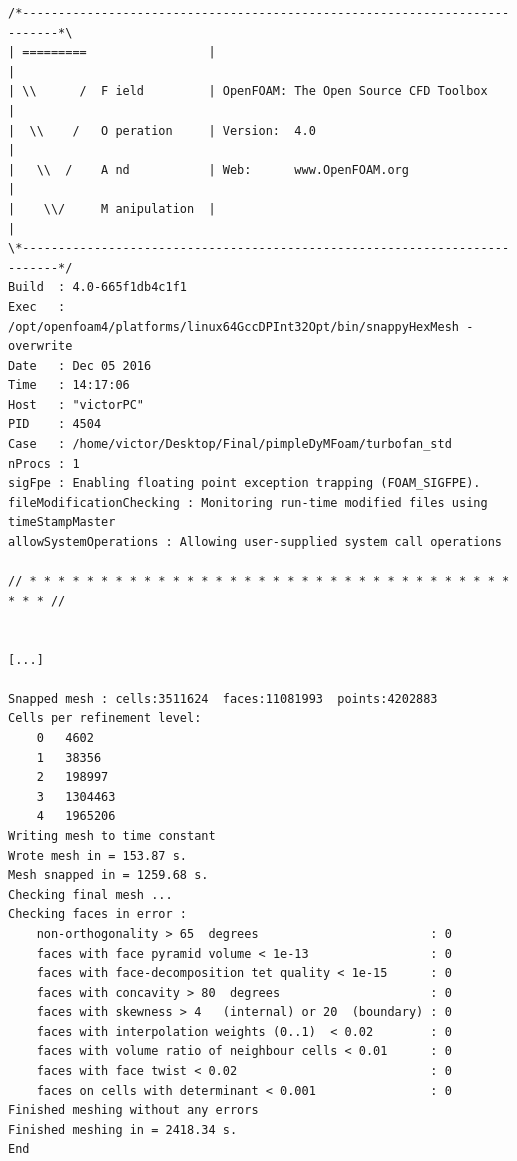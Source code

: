 \begin{footnotesize}
\begin{verbatim}
/*---------------------------------------------------------------------------*\
| =========                 |                                                 |
| \\      /  F ield         | OpenFOAM: The Open Source CFD Toolbox           |
|  \\    /   O peration     | Version:  4.0                                   |
|   \\  /    A nd           | Web:      www.OpenFOAM.org                      |
|    \\/     M anipulation  |                                                 |
\*---------------------------------------------------------------------------*/
Build  : 4.0-665f1db4c1f1
Exec   : /opt/openfoam4/platforms/linux64GccDPInt32Opt/bin/snappyHexMesh -overwrite
Date   : Dec 05 2016
Time   : 14:17:06
Host   : "victorPC"
PID    : 4504
Case   : /home/victor/Desktop/Final/pimpleDyMFoam/turbofan_std
nProcs : 1
sigFpe : Enabling floating point exception trapping (FOAM_SIGFPE).
fileModificationChecking : Monitoring run-time modified files using timeStampMaster
allowSystemOperations : Allowing user-supplied system call operations

// * * * * * * * * * * * * * * * * * * * * * * * * * * * * * * * * * * * * * //


[...]

Snapped mesh : cells:3511624  faces:11081993  points:4202883
Cells per refinement level:
    0	4602
    1	38356
    2	198997
    3	1304463
    4	1965206
Writing mesh to time constant
Wrote mesh in = 153.87 s.
Mesh snapped in = 1259.68 s.
Checking final mesh ...
Checking faces in error :
    non-orthogonality > 65  degrees                        : 0
    faces with face pyramid volume < 1e-13                 : 0
    faces with face-decomposition tet quality < 1e-15      : 0
    faces with concavity > 80  degrees                     : 0
    faces with skewness > 4   (internal) or 20  (boundary) : 0
    faces with interpolation weights (0..1)  < 0.02        : 0
    faces with volume ratio of neighbour cells < 0.01      : 0
    faces with face twist < 0.02                           : 0
    faces on cells with determinant < 0.001                : 0
Finished meshing without any errors
Finished meshing in = 2418.34 s.
End

\end{verbatim}
\end{footnotesize}